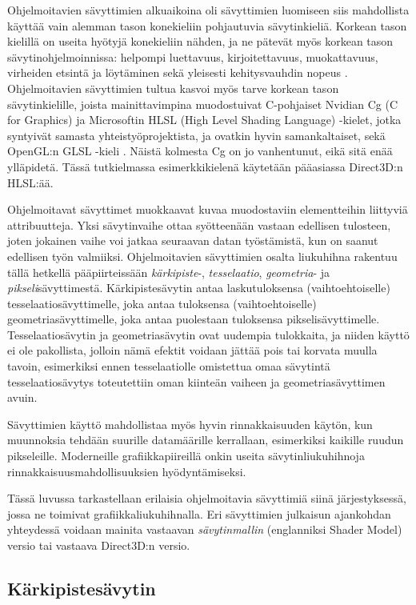 \documentclass[finnish]{tktltiki2}
\theoremstyle{definition}
\theoremstyle{remark}
\begin{document}
Ohjelmoitavien sävyttimien alkuaikoina oli sävyttimien luomiseen siis mahdollista käyttää vain alemman tason konekieliin pohjautuvia sävytinkieliä. Korkean tason kielillä on useita hyötyjä konekieliin nähden, ja ne pätevät myös korkean tason sävytinohjelmoinnissa: helpompi luettavuus, kirjoitettavuus, muokattavuus, virheiden etsintä ja löytäminen sekä yleisesti kehitysvauhdin nopeus \cite{She08}. Ohjelmoitavien sävyttimien tultua kasvoi myös tarve korkean tason sävytinkielille, joista mainittavimpina muodostuivat C-pohjaiset Nvidian Cg (C for Graphics) \cite{Nvi03} ja Microsoftin HLSL (High Level Shading Language) -kielet, jotka syntyivät samasta yhteistyöprojektista, ja ovatkin hyvin samankaltaiset, sekä OpenGL:n GLSL -kieli \cite{Khr15}. Näistä kolmesta Cg on jo vanhentunut, eikä sitä enää ylläpidetä. Tässä tutkielmassa esimerkkikielenä käytetään pääasiassa Direct3D:n HLSL:ää.

Ohjelmoitavat sävyttimet muokkaavat kuvaa muodostaviin elementteihin liittyviä attribuutteja. Yksi sävytinvaihe ottaa syötteenään vastaan edellisen tulosteen, joten jokainen vaihe voi jatkaa seuraavan datan työstämistä, kun on saanut edellisen työn valmiiksi. Ohjelmoitavien sävyttimien osalta liukuhihna rakentuu tällä hetkellä pääpiirteissään \emph{kärkipiste}-, \emph{tesselaatio}, \emph{geometria}- ja \emph{pikseli}sävyttimestä. Kärkipistesävytin antaa laskutuloksensa (vaihtoehtoiselle) tesselaatiosävyttimelle, joka antaa tuloksensa (vaihtoehtoiselle) geometriasävyttimelle, joka antaa puolestaan tuloksensa pikselisävyttimelle. Tesselaatiosävytin ja geometriasävytin ovat uudempia tulokkaita, ja niiden käyttö ei ole pakollista, jolloin nämä efektit voidaan jättää pois tai korvata muulla tavoin, esimerkiksi ennen tesselaatiolle omistettua omaa sävytintä tesselaatiosävytys toteutettiin oman kiinteän vaiheen ja geometriasävyttimen avuin. 

Sävyttimien käyttö mahdollistaa myös hyvin rinnakkaisuuden käytön, kun muunnoksia tehdään suurille datamäärille kerrallaan, esimerkiksi kaikille ruudun pikseleille. Moderneille grafiikkapiireillä onkin useita sävytinliukuhihnoja rinnakkaisuusmahdollisuuksien hyödyntämiseksi.

Tässä luvussa tarkastellaan erilaisia ohjelmoitavia sävyttimiä siinä järjestyksessä, jossa ne toimivat grafiikkaliukuhihnalla. Eri sävyttimien julkaisun ajankohdan yhteydessä voidaan mainita vastaavan \emph{sävytinmallin} (englanniksi Shader Model) versio tai vastaava Direct3D:n versio.

\subsection{Kärkipistesävytin}
\end{document}
